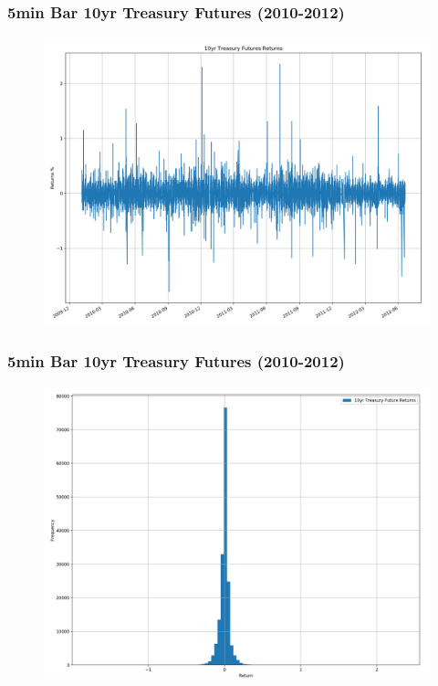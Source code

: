 \documentclass{beamer}
\begin{document}
\begin{frame}
\frametitle{5min Bar 10yr Treasury Futures (2010-2012)}
\begin{figure}[h!]
\includegraphics[width=\textwidth]{ty_returns_2010.png}
\end{figure}
\end{frame}

\begin{frame}
\frametitle{5min Bar 10yr Treasury Futures (2010-2012)}
\begin{figure}[h!]
\includegraphics[width=\textwidth]{ty_returns_2010_hist.png}
\end{figure}
\end{frame}
\end{document}
